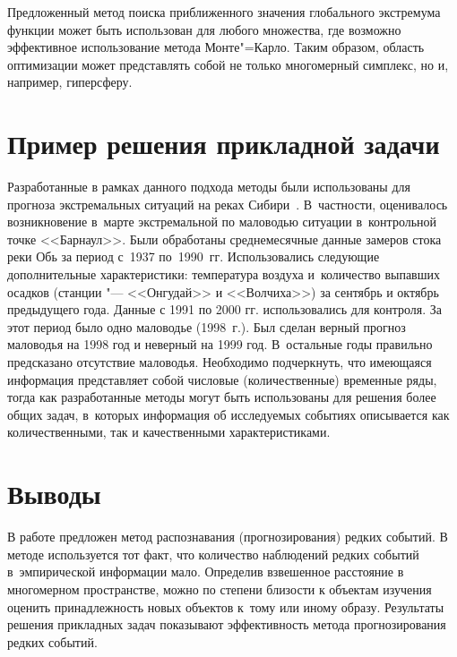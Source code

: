 \documentclass[twoside]{article}
\begin{document}
Предложенный метод поиска приближенного значения глобального
экстремума функции может быть использован для любого множества, где
возможно эффективное использование метода Монте"=Карло. Таким
образом, область оптимизации может представлять собой не только
многомерный симплекс, но и, например, гиперсферу.

\section{Пример решения прикладной задачи}
Разработанные в рамках данного подхода методы были использованы для
прогноза экстремальных ситуаций на реках Сибири~\cite{bibArticle1}.
В~частности, оценивалось возникновение в~марте экстремальной по
маловодью ситуации в~контрольной точке <<Барнаул>>. Были обработаны
среднемесячные данные замеров стока реки Обь за период с~1937 по~1990~гг. 
Использовались следующие дополнительные характеристики:
температура воздуха и~количество выпавших осадков (станции "---
<<Онгудай>>  и <<Волчиха>>) за сентябрь и октябрь предыдущего года.
Данные с 1991 по 2000 гг. использовались для контроля. За этот
период было одно маловодье (1998~г.). Был сделан верный прогноз
маловодья на 1998 год и неверный на 1999 год. В~остальные годы
правильно предсказано отсутствие маловодья. Необходимо подчеркнуть,
что имеющаяся информация представляет собой числовые
(количественные) временные ряды, тогда как  разработанные методы
могут быть использованы для решения более общих задач, в~которых
информация об исследуемых событиях описывается как количественными,
так и качественными \mbox{характеристиками}.

\section{Выводы}
В работе предложен метод распознавания (прогнозирования) редких
событий. В методе используется тот факт, что количество наблюдений
редких событий в~эмпирической информации мало. Определив взвешенное
расстояние в многомерном пространстве, можно по степени близости к
объектам изучения оценить принадлежность новых объектов к~тому или
иному образу. Результаты решения прикладных задач показывают
эффективность метода прогнозирования редких событий.
\end{document}
